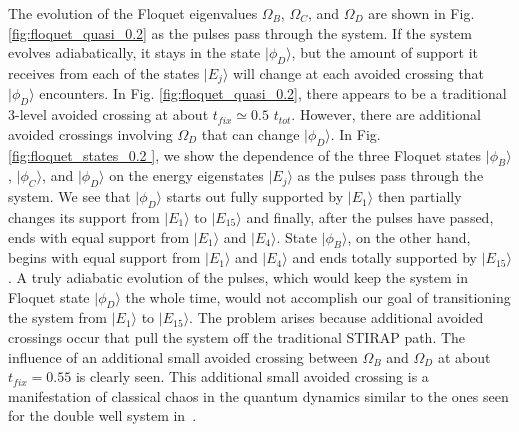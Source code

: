 \documentclass{article}
\begin{document}
The evolution of the Floquet eigenvalues $\Omega_B$, $\Omega_C$, and $\Omega_D$ are shown in Fig. \ref{fig:floquet_quasi_0.2} as the pulses pass through the system.      If  the system  evolves adiabatically, it stays in the state $|\phi_D\rangle$, but the amount of support it receives from each of the states $|E_j{\rangle}$ will change at each avoided crossing that $|\phi_D\rangle$ encounters. In Fig. \ref{fig:floquet_quasi_0.2}, there appears to be a  traditional $3$-level avoided crossing  at  about $t_{fix}\simeq 0.5$ $t_{tot}$. However, there are  additional avoided crossings involving  $\Omega_D$ that can  change $|\phi_D\rangle$.   In Fig. \ref{fig:floquet_states_0.2 }, we show the dependence of the three Floquet states  $|\phi_B\rangle$, $|\phi_C\rangle$, and $|\phi_D\rangle$ on the energy eigenstates 
$|E_j{\rangle}$ as the pulses pass through the system. We see that $|\phi_D\rangle$ starts out fully supported by $|E_1{\rangle}$ then partially changes its support from $\vert E_1\rangle$ to $\vert E_{15}\rangle$ and finally, after the pulses have passed, ends with equal support from $|E_1{\rangle}$ and $|E_4{\rangle}$.   State $|\phi_B\rangle$, on the other hand, begins with equal support from $|E_1{\rangle}$ and $|E_4{\rangle}$ and ends totally supported by $|E_{15}{\rangle}$.  A truly adiabatic evolution of the pulses, which would keep the system in Floquet state $|\phi_D\rangle$ the whole time, would not accomplish our goal of transitioning the system from $\vert E_1{\rangle}$ to $\vert E_{15}{\rangle}$.  The problem arises because additional avoided crossings occur that pull the system off the traditional STIRAP path.  
 The influence of an additional small  avoided crossing between $\Omega_B$ and $\Omega_D$ at about $t_{fix}=0.55$ is clearly  seen.  This additional small avoided crossing is a manifestation of classical chaos in the quantum dynamics similar to the ones seen for the double well system in~\cite{roy:reichl:dblwell}.
  
\end{document}
